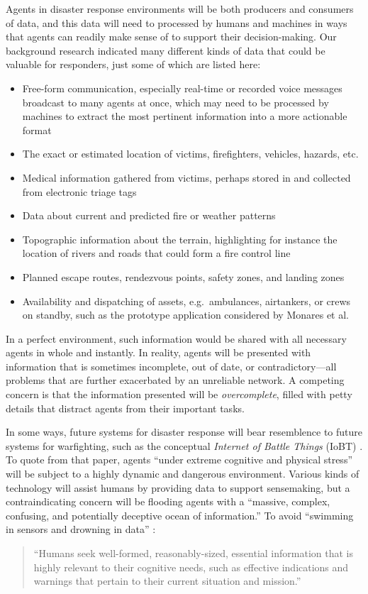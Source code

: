 \documentclass[]             %
{NASA}                       %
\theoremstyle{definition}
\begin{document}
Agents in disaster response environments will be both
producers and consumers of data, and this data will need to processed
by humans and machines in ways that agents can readily make sense of
to support their decision-making. Our background research indicated
many different kinds of data that could be valuable for
responders, just some of which are listed here:
\begin{itemize}
\item Free-form communication, especially real-time or recorded voice messages
  broadcast to many agents at once, which may need to be processed by
  machines to extract the most pertinent information into a more
  actionable format
\item The exact or estimated location of victims, firefighters,
  vehicles, hazards, etc.
\item Medical information gathered from victims, perhaps stored in and
  collected from electronic triage tags \cite{2009:triagetag}
\item Data about current and predicted fire or weather patterns
\item Topographic information about the terrain, highlighting for
  instance the location of rivers and roads that could form a fire
  control line
\item Planned escape routes, rendezvous points, safety zones, and
  landing zones
\item Availability and dispatching of assets, e.g.~ambulances,
  airtankers, or crews on standby, such as the prototype application
  considered by Monares et al. \cite{2011:monares}
\end{itemize}
In a perfect environment, such information would be shared with all
necessary agents in whole and instantly. In reality, agents will be
presented with information that is sometimes incomplete, out of date,
or contradictory---all problems that are further exacerbated by an
unreliable network. A competing concern is that the information
presented will be \emph{overcomplete}, filled with petty details that
distract agents from their important tasks.

In some ways, future systems for disaster response will bear
resemblence to future systems for warfighting, such as the conceptual
\emph{Internet of Battle Things} (IoBT) \cite{2016:iobt}. To quote
from that paper, agents ``under extreme cognitive and physical
stress'' will be subject to a highly dynamic and dangerous
environment. Various kinds of technology will assist humans by
providing data to support sensemaking, but a contraindicating concern
will be flooding agents with a ``massive, complex, confusing, and
potentially deceptive ocean of information.'' To avoid ``swimming in
sensors and drowning in data'' \cite{2010:magnuson}:
\begin{quote}
``Humans seek well-formed, reasonably-sized, essential information
  that is highly relevant to their cognitive needs, such as effective
  indications and warnings that pertain to their current situation and
  mission.'' \cite{2016:iobt}
\end{quote}
\end{document}
